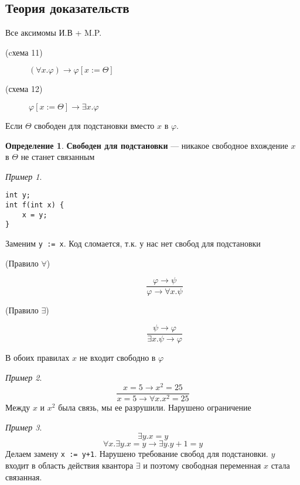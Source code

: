\documentclass[english]{article}
\theoremstyle{plain}
\theoremstyle{remark}
\newtheorem*{examp}{Пример}
\theoremstyle{definition}
\newtheorem*{definition}{Определение}
\begin{document}
\subsection{Теория доказательств}
\label{sec:org10ab678}
Все аксимомы И.В + M.P.
\begin{description}
\item[{(cхема 11)}] \((\forall x. \varphi) \to \varphi[x:=\Theta]\)
\item[{(схема 12)}] \(\varphi[x:=\Theta]\to \exists x. \varphi\)
\end{description}
Если \(\Theta\) свободен для подстановки вместо \(x\) в \(\varphi\).
\begin{definition}
\textbf{Свободен для подстановки} --- никакое свободное вхождение \(x\) в \(\Theta\) не станет связанным
\end{definition}
\begin{examp}
\-
\begin{verbatim}
int y;
int f(int x) {
	x = y;
}
\end{verbatim}
Заменим \texttt{y := x}. Код сломается, т.к. у нас нет свобод для подстановки
\end{examp}
\begin{description}
\item[{(Правило \(\forall\))}] \[\frac{\varphi \to \psi}{\varphi \to \forall x. \psi}\]
\item[{(Правило \(\exists\))}] \[ \frac{\psi \to \varphi}{\exists x.\psi \to \varphi} \]
\end{description}
В обоих правилах \(x\) не входит свободно в \(\varphi\)
\begin{examp}
\[ \frac{x = 5 \to x^2 = 25}{x = 5 \to \forall x. x^2 = 25} \]
Между \(x\) и \(x^2\) была связь, мы ее разрушили. Нарушено ограничение
\end{examp}
\begin{examp}
\[ \exists y. x = y \]
\[ \forall x. \exists y. x = y \to \exists y. y + 1 = y \]
Делаем замену \texttt{x := y+1}. Нарушено требование свобод для подстановки. \(y\) входит в область действия квантора \(\exists\) и поэтому свободная переменная \(x\) стала связанная.
\end{examp}
\end{document}
